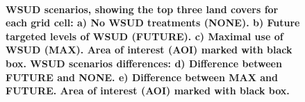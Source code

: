 \documentclass[final,3p,times,authoryear]{elsarticle}
\begin{document}
\begin{figure}[!htbp]
\\
\caption{\bf WSUD scenarios, showing the top three land covers for each grid cell: a) No WSUD treatments (NONE). b) Future targeted levels of WSUD (FUTURE). c) Maximal use of WSUD (MAX). Area of interest (AOI) marked with black box. WSUD scenarios differences: d) Difference between FUTURE and NONE. e) Difference between MAX and FUTURE. Area of interest (AOI) marked with black box. }    
 \label{fig:sunburyScenarios}  \label{fig:sunburyDiffScenarios} 
\end{figure} 
\end{document}
